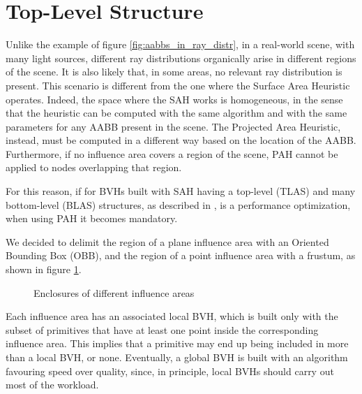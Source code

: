 \documentclass[acmtog, anonymous, review]{acmart}
\begin{document}
\section{Top-Level Structure} \label{sec:top_level}
Unlike the example of figure \ref{fig:aabbs_in_ray_distr}, in a real-world scene, with many light sources, different ray distributions organically arise in different regions of the scene. It is also likely that, in some areas, no relevant ray distribution is present. This scenario is different from the one where the Surface Area Heuristic operates. Indeed, the space where the SAH works is homogeneous, in the sense that the heuristic can be computed with the same algorithm and with the same parameters for any AABB present in the scene. The Projected Area Heuristic, instead, must be computed in a different way based on the location of the AABB. Furthermore, if no influence area covers a region of the scene, PAH cannot be applied to nodes overlapping that region.

For this reason, if for BVHs built with SAH having a top-level (TLAS) and many bottom-level (BLAS) structures, as described in \cite{tlas_blas}, is a performance optimization, when using PAH it becomes mandatory.

We decided to delimit the region of a plane influence area with an Oriented Bounding Box (OBB), and the region of a point influence area with a frustum, as shown in figure \ref{fig:influence_areas}.

\begin{figure}[H]
  \quad
  \caption{Enclosures of different influence areas}
  \label{fig:influence_areas} 
\end{figure}

Each influence area has an associated local BVH, which is built only with the subset of primitives that have at least one point inside the corresponding influence area. This implies that a primitive may end up being included in more than a local BVH, or none. Eventually, a global BVH is built with an algorithm favouring speed over quality, since, in principle, local BVHs should carry out most of the workload.
\end{document}
